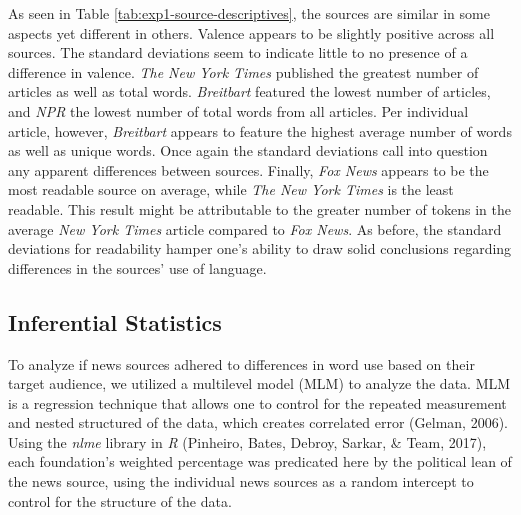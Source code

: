 \documentclass[english,,man]{apa6}
\begin{document}
As seen in Table \ref{tab:exp1-source-descriptives}, the sources are similar in some aspects yet different in others. Valence appears to be slightly positive across all sources. The standard deviations seem to indicate little to no presence of a difference in valence.
\emph{The New York Times} published the greatest number of articles as well as total words. \emph{Breitbart} featured the lowest number of articles, and \emph{NPR} the lowest number of total words from all articles. Per individual article, however, \emph{Breitbart} appears to feature the highest average number of words as well as unique words. Once again the standard deviations call into question any apparent differences between sources. Finally, \emph{Fox News} appears to be the most readable source on average, while \emph{The New York Times} is the least readable. This result might be attributable to the greater number of tokens in the average \emph{New York Times} article compared to \emph{Fox News}. As before, the standard deviations for readability hamper one's ability to draw solid conclusions regarding differences in the sources' use of language.

\hypertarget{inferential-statistics}{%
\subsection{Inferential Statistics}\label{inferential-statistics}}

To analyze if news sources adhered to differences in word use based on their target audience, we utilized a multilevel model (MLM) to analyze the data. MLM is a regression technique that allows one to control for the repeated measurement and nested structured of the data, which creates correlated error (Gelman, 2006). Using the \emph{nlme} library in \emph{R} (Pinheiro, Bates, Debroy, Sarkar, \& Team, 2017), each foundation's weighted percentage was predicated here by the political lean of the news source, using the individual news sources as a random intercept to control for the structure of the data.
\end{document}
